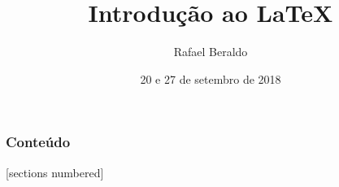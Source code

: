 \documentclass[final,notheorems]{beamer}
\title{Introdução ao \LaTeX}
\author{Rafael Beraldo \qquad \email{rberaldo@cabaladada.org}}
\date{20 e 27 de setembro de 2018}
\begin{document}
\maketitle

\begin{frame}
  \frametitle{Conteúdo}
  [sections numbered]
  \begin{multicols}{2}
    \tableofcontents
  \end{multicols}
\end{frame}






















\end{document}
